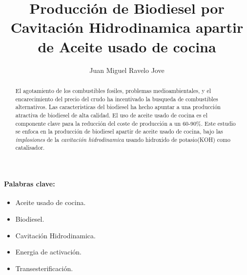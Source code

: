 \documentclass[a4paper,10pt]{article}
\title{Producción de Biodiesel por Cavitación Hidrodinamica apartir de Aceite usado de cocina}
\author{Juan Miguel Ravelo Jove}
\begin{document}
\maketitle

\begin{abstract}
El agotamiento de los combustibles fosiles, problemas medioambientales, y el encarecimiento del precio del crudo ha incentivado la busqueda de combustibles alternativos. Las caracteristicas del biodiesel ha hecho apuntar a una producción atractiva de biodiesel de alta calidad. El uso de aceite usado de cocina es el componente clave para la reducción del coste de producción a un 60-90\%. Este estudio se enfoca en la producción de biodiesel apartir de aceite usado de cocina, bajo las \emph{implosiones} de la \emph{cavitación hidrodinamica} usando hidroxido de potasio(KOH) como catalisador.
\end{abstract}

\paragraph{Palabras clave:} 
\begin{itemize}
 \item Aceite usado de cocina.
 \item Biodiesel.
 \item Cavitación Hidrodinamica.
 \item Energia de activación.
 \item Transesterificación.
\end{itemize}
\end{document}
